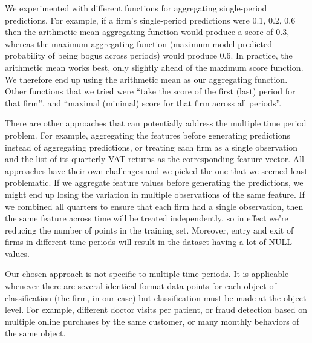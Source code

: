 We experimented with different functions for aggregating single-period predictions. For example, if a firm's single-period predictions were 0.1, 0.2, 0.6 then the arithmetic mean aggregating function would produce a score of $0.3$, whereas the maximum aggregating function  (maximum model-predicted probability of being bogus across periods) would produce $0.6$. In practice, the arithmetic mean works best, only slightly ahead of the maximum score function. We therefore end up using the arithmetic mean as our aggregating function. Other functions that we tried were ``take the score of the first (last) period for that firm'', and ``maximal (minimal) score for that firm across all periods''.  

There are other approaches that can potentially address the multiple time period problem. For example, aggregating the features before generating predictions instead of aggregating predictions, or treating each firm as a single observation and the list of its quarterly VAT returns as the corresponding feature vector. All approaches have their own challenges and we picked the one that we seemed least problematic. If we aggregate feature values before generating the predictions, we might end up losing the variation in  multiple observations of the same feature. If we combined all quarters to ensure that each firm had a single observation, then the same feature across time will be treated independently, so in effect we’re reducing the number of points in the training set. Moreover, entry and exit of firms in different time periods will result in the dataset having a lot of NULL values.

Our chosen approach is not specific to multiple time periods. It is applicable whenever there are several identical-format data points for each object of classification (the firm, in our case) but classification must be made at the object level. For example, different doctor visits per patient,  or fraud detection based on multiple online purchases by the same customer, or many monthly behaviors of the same object.


